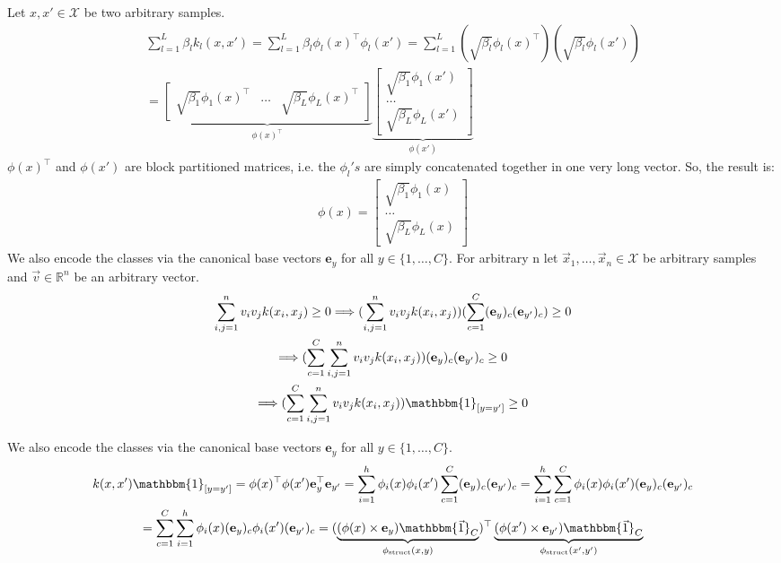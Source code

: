 \documentclass[a4paper]{article}
\newcommand{\e}{\textbf{e}}
\newcommand{\1}{\mathds{1}}
\begin{document}
Let $x,x'\in \mathcal{X}$ be two arbitrary samples.
\begin{gather*}
	\sum_{l=1}^L \beta_l k_l(x,x') 
	= 
	\sum_{l=1}^L \beta_l \phi_l(x)^\top \phi_l(x') 
	=
	\sum_{l=1}^L (\sqrt{\beta_l} \phi_l(x)^\top) (\sqrt{\beta_l} \phi_l(x'))
	\\
	=
\underbrace{
\begin{bmatrix}
	\sqrt{\beta_1} \phi_1(x)^\top	& \dots	& \sqrt{\beta_L} \phi_L(x)^\top      
\end{bmatrix}
}_{\phi(x)^\top}
\underbrace{
\begin{bmatrix}
	\sqrt{\beta_1} \phi_1(x')	\\
	\dots	\\
	\sqrt{\beta_L} \phi_L(x')      
\end{bmatrix}
}_{\phi(x')}
\end{gather*}
$\phi(x)^\top$ and $\phi(x')$ are block partitioned matrices, 
i.e. the $\phi_l's$ are simply concatenated 
together in one very long vector. So, the result is: 
\begin{gather*}
	\phi(x) = 
	\begin{bmatrix}
		\sqrt{\beta_1} \phi_1(x)	\\
		\dots	\\
		\sqrt{\beta_L} \phi_L(x)      
	\end{bmatrix}
\end{gather*}
\newpage 
{}
We also encode the classes via the canonical base vectors 
$\e_y$ for all $y\in \{1,\ldots,C\}$.
For arbitrary n let $\vec{x}_1, \ldots, \vec{x}_n \in \mathcal{X}$ be arbitrary samples 
and $\vec{v}\in\mathbb{R}^n$ be an arbitrary vector.
\begin{gather*}
	\sum_{i,j=1}^n v_i v_j k(x_i,x_j) \geq 0
	\Longrightarrow
	(\sum_{i,j=1}^n v_i v_j k(x_i,x_j)) (\sum_{c=1}^C (\e_y)_c (\e_{y'})_c) \geq 0
	\\
	\Longrightarrow 
	(\sum_{c=1}^C\sum_{i,j=1}^n v_i v_j k(x_i,x_j))  (\e_y)_c (\e_{y'})_c \geq 0
	\\
	\Longrightarrow 
	(\sum_{c=1}^C\sum_{i,j=1}^n v_i v_j k(x_i,x_j))  \mathbbm{1}_{[y=y']} \geq 0
\end{gather*}

We also encode the classes via the canonical base vectors 
$\e_y$ for all $y\in \{1,\ldots,C\}$.
\begin{gather*}
	k(x,x')\mathbbm{1}_{[y=y']}
	=
	\phi(x)^\top \phi(x') \e^\top_y \e_{y'}
	=
	\sum_{i=1}^h\phi_{i}(x)\phi_{i}(x')\sum_{c=1}^C(\e_y)_c (\e_{y'})_c
	=
	\sum_{i=1}^h\sum_{c=1}^C\phi_{i}(x)\phi_{i}(x') (\e_y)_c (\e_{y'})_c
	\\
	=
	\sum_{c=1}^C \sum_{i=1}^h \phi_{i}(x)(\e_y)_c \phi_{i}(x') (\e_{y'})_c 	
	=
	(
	\underbrace{
		(\phi(x)\times \e_y)\mathbbm{\vec{1}}_C 
	}_{\phi_{\text{struct}}(x,y)}
	)^\top
	\underbrace{
	(\phi(x')\times \e_{y'})\mathbbm{\vec{1}}_C
	}_{\phi_{\text{struct}}(x',y')}
\end{gather*}
\end{document}

